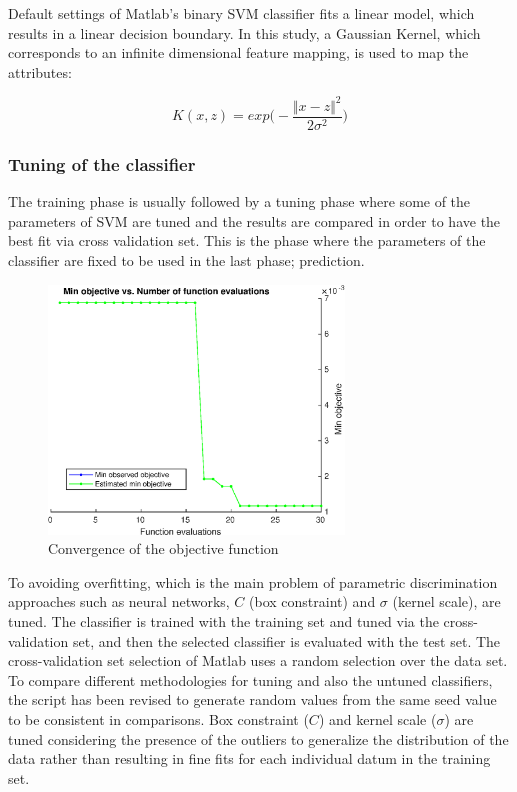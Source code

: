 Default settings of Matlab's binary SVM classifier fits a linear model, which results in a linear decision boundary.  
In this study, a Gaussian Kernel, which corresponds to an infinite dimensional feature mapping, is used to map the attributes:

\begin{equation}
K (x,z) = exp \bigg(-\frac{\Vert x - z \Vert ^ 2}{2 \sigma^2} \bigg)
\end{equation}


\subsubsection{Tuning of the classifier}

The training phase is usually followed by a tuning phase where some of the parameters of SVM are tuned and the results are compared in order to have the best fit via cross validation set. This is the phase where the parameters of the classifier are fixed to be used in the last phase; prediction.

\begin{figure}
\begin{center}
\includegraphics[width=0.7\textwidth]{figures/objectiveFuncEval}    %
\caption{Convergence of the objective function} 
\label{fig:objectiveFuncEval}
\end{center}
\end{figure}

To avoiding overfitting, which is the main problem of parametric discrimination approaches such as neural networks, $C$ (box constraint) and $\sigma$ (kernel scale), are tuned.
The classifier is trained with the training set and tuned via the cross-validation set, and then the selected classifier is evaluated with the test set. The cross-validation set selection of Matlab uses a random selection over the data set. 
To compare different methodologies for tuning and also the untuned classifiers, the script has been revised to generate random values from the same seed value to be consistent in comparisons.
Box constraint ($C$) and kernel scale ($\sigma$) are tuned considering the presence of the outliers to generalize the distribution of the data rather than resulting in fine fits for each individual datum in the training set. 

